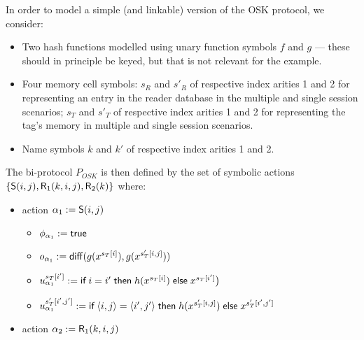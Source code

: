 \begin{example}[OSK]
  \label{ex:osk-bi-process}
  In order to model a simple (and linkable) version of the OSK protocol,
  we consider:
  \begin{itemize}
    \item Two hash functions modelled using unary function symbols
      $f$ and $g$ --- these should in principle be keyed, but that is
      not relevant for the example.
    \item Four memory cell symbols:
      $s_R$ and $s'_R$ of respective index arities 1 and 2 for representing
      an entry in the reader database in the multiple and single session
      scenarios;
      $s_T$ and $s'_T$ of respective index arities 1 and 2 for representing
      the tag's memory in multiple and single session scenarios.
    \item Name symbols $k$ and $k'$ of respective index arities 1 and 2.
  \end{itemize}
  The bi-protocol $P_{OSK}$ is then defined by
  the set of symbolic actions $\{\textsf{S}(i,j),\textsf{R}_1(k,i,j),\textsf{R}_2(k)\}$ where:
    \begin{itemize}
      \item action $\alpha_1 := \textsf{S}(i,j)$
        \begin{itemize}
          \item $\phi_{\alpha_1} := \textsf{true}$
          \item $o_{\alpha_1} := \mathsf{diff}(g(x^{s_T[i]}),g(x^{s'_T[i,j]}))$
          \item $u_{\alpha_1}^{s_T[i']} :=
              \textsf{if}\; i=i' \;\textsf{then}\; h(x^{s_T[i]})
              \;\textsf{else}\; x^{s_T[i']}
            \bigr)$
          \item $u_{\alpha_1}^{s'_T[i',j']} :=
              \textsf{if}\; \langle i,j \rangle = \langle i',j' \rangle
              \;\textsf{then}\; h(x^{s'_T[i,j]})
              \;\textsf{else}\; x^{s'_T[i',j']}$
        \end{itemize}
      \item action $\alpha_2 := \textsf{R}_1(k,i,j)$
\end{itemize}
\end{example}
